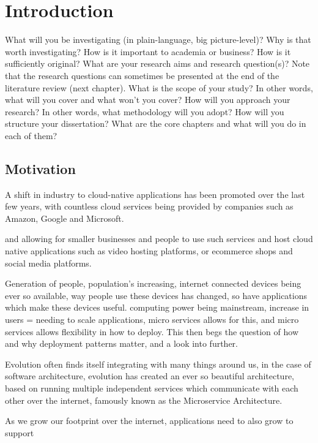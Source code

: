 \chapter{Introduction}



    What will you be investigating (in plain-language, big picture-level)?
    Why is that worth investigating? How is it important to academia or business? How is it sufficiently original?
    What are your research aims and research question(s)? Note that the research questions can sometimes be presented at the end of the literature review (next chapter).
    What is the scope of your study? In other words, what will you cover and what won’t you cover?
    How will you approach your research? In other words, what methodology will you adopt?
    How will you structure your dissertation? What are the core chapters and what will you do in each of them?


\section{Motivation}
A shift in industry to cloud-native applications has been promoted over the last few years, with countless cloud services being provided by companies such as Amazon, Google and Microsoft. 


and allowing for smaller businesses and people to use such services and host cloud native applications such as video hosting platforms, or ecommerce shops and social media platforms. 


Generation of people, population's increasing, internet connected devices being ever so available, way people use these devices has changed, so have applications which make these devices useful. computing power being mainstream, increase in users = needing to scale applications, micro services allows for this, and micro services allows flexibility in how to deploy. This then begs the question of  how and why deployment patterns matter, and a look into further.

Evolution often finds itself integrating with many things around us, in the case of software architecture, evolution has created an ever so beautiful architecture, based on running multiple independent services which communicate with each other over the internet, famously known as the Microservice Architecture. 

As we grow our footprint over the internet, applications need to also grow to support 


